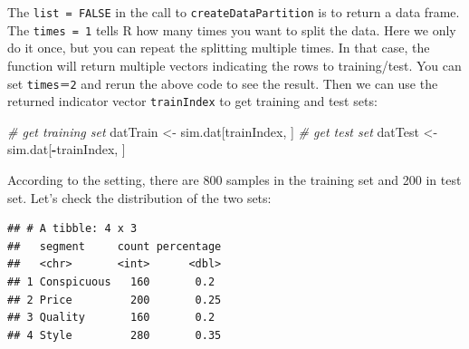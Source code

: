 \documentclass[12pt,]{krantz}
\makeatletter
\newenvironment{Shaded}{\begin{snugshade}}{\end{snugshade}}
\newcommand{\CommentTok}[1]{\textcolor[rgb]{0.37,0.37,0.37}{\textit{#1}}}
\newcommand{\DataTypeTok}[1]{\textcolor[rgb]{0.27,0.27,0.27}{#1}}
\newcommand{\DecValTok}[1]{\textcolor[rgb]{0.06,0.06,0.06}{#1}}
\newcommand{\KeywordTok}[1]{\textcolor[rgb]{0.27,0.27,0.27}{\textbf{#1}}}
\newcommand{\NormalTok}[1]{#1}
\newcommand{\OperatorTok}[1]{\textcolor[rgb]{0.43,0.43,0.43}{\textbf{#1}}}
\newcommand{\StringTok}[1]{\textcolor[rgb]{0.5,0.5,0.5}{#1}}
\newenvironment{kframe}{%
\medskip{}
\setlength{\fboxsep}{.8em}
 \def\at@end@of@kframe{}%
 \ifinner\ifhmode%
  \def\at@end@of@kframe{\end{minipage}}%
  \begin{minipage}{\columnwidth}%
 \fi\fi%
 \def\FrameCommand##1{\hskip\@totalleftmargin \hskip-\fboxsep
 \colorbox{shadecolor}{##1}\hskip-\fboxsep
     \hskip-\linewidth \hskip-\@totalleftmargin \hskip\columnwidth}%
 \MakeFramed {\advance\hsize-\width
   \@totalleftmargin\z@ \linewidth\hsize
   \@setminipage}}%
 {\par\unskip\endMakeFramed%
 \at@end@of@kframe}
\renewenvironment{Shaded}{\begin{kframe}}{\end{kframe}}
\makeatother
\begin{document}
The \texttt{list\ =\ FALSE} in the call to \texttt{createDataPartition} is to return a data frame. The \texttt{times\ =\ 1} tells R how many times you want to split the data. Here we only do it once, but you can repeat the splitting multiple times. In that case, the function will return multiple vectors indicating the rows to training/test. You can set \texttt{times＝2} and rerun the above code to see the result. Then we can use the returned indicator vector \texttt{trainIndex} to get training and test sets:

\begin{Shaded}
\begin{Highlighting}[]
\CommentTok{# get training set}
\NormalTok{datTrain <-}\StringTok{ }\NormalTok{sim.dat[trainIndex, ]}
\CommentTok{# get test set}
\NormalTok{datTest <-}\StringTok{ }\NormalTok{sim.dat[}\OperatorTok{-}\NormalTok{trainIndex, ]}
\end{Highlighting}
\end{Shaded}

According to the setting, there are 800 samples in the training set and 200 in test set. Let's check the distribution of the two sets:

\begin{Shaded}
\end{Shaded}

\begin{verbatim}
## # A tibble: 4 x 3
##   segment     count percentage
##   <chr>       <int>      <dbl>
## 1 Conspicuous   160       0.2 
## 2 Price         200       0.25
## 3 Quality       160       0.2 
## 4 Style         280       0.35
\end{verbatim}

\begin{Shaded}
\end{Shaded}
\end{document}

